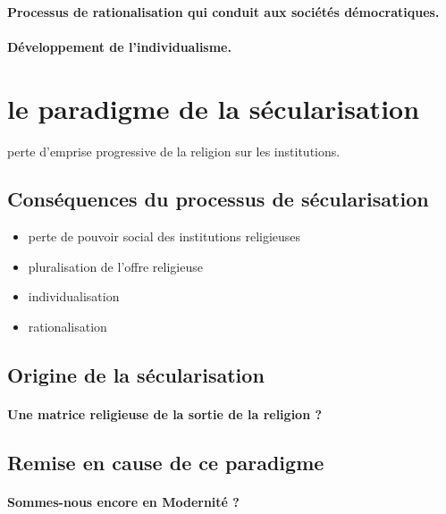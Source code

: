 \paragraph{Processus de rationalisation qui conduit aux sociétés démocratiques.} 
\paragraph{Développement de l’individualisme.} 

\section{le paradigme de la sécularisation}
 \begin{Def}[Sécularisation] perte d’emprise progressive de la religion sur les institutions.
\end{Def}
 

\subsection{Conséquences du processus de sécularisation}
\begin{itemize}
    \item  perte de pouvoir social des institutions religieuses
   \item  pluralisation de l’offre religieuse
   \item  individualisation
   \item  rationalisation
\end{itemize}


\subsection{Origine de la sécularisation}

\paragraph{Une matrice religieuse de la sortie de la religion ?}

\subsection{Remise en cause de ce paradigme}
\paragraph{Sommes-nous encore en Modernité ?}



